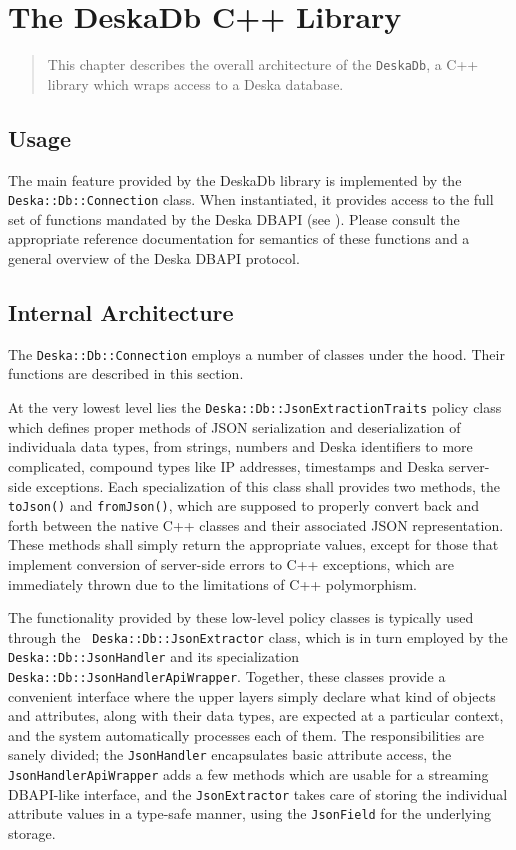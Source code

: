 \documentclass[deska]{subfiles}
\begin{document}
\chapter{The DeskaDb C++ Library}

\begin{abstract}
This chapter describes the overall architecture of the {\tt DeskaDb}, a C++ library which wraps access to a Deska
database.
\end{abstract}

\section{Usage}

The main feature provided by the DeskaDb library is implemented by the {\tt Deska::Db::Connection} class.  When
instantiated, it provides access to the full set of functions mandated by the Deska DBAPI (see ).
Please consult the appropriate reference documentation for semantics of these functions and a general overview of the
Deska DBAPI protocol.

\section{Internal Architecture}

The {\tt Deska::Db::Connection} employs a number of classes under the hood.  Their functions are described in this
section.

At the very lowest level lies the {\tt Deska::Db::JsonExtractionTraits} policy class which defines proper methods of
JSON serialization and deserialization of individuala data types, from strings, numbers and Deska identifiers to more
complicated, compound types like IP addresses, timestamps and Deska server-side exceptions.  Each specialization of this
class shall provides two methods, the {\tt toJson()} and {\tt fromJson()}, which are supposed to properly convert back
and forth between the native C++ classes and their associated JSON representation.  These methods shall simply return
the appropriate values, except for those that implement conversion of server-side errors to C++ exceptions, which are
immediately thrown due to the limitations of C++ polymorphism.

The functionality provided by these low-level policy classes is typically used through the {\tt
Deska::Db::JsonExtractor} class, which is in turn employed by the {\tt Deska::Db::JsonHandler} and its specialization
{\tt Deska::Db::JsonHandlerApiWrapper}.  Together, these classes provide a convenient interface where the upper layers
simply declare what kind of objects and attributes, along with their data types, are expected at a particular context,
and the system automatically processes each of them.  The responsibilities are sanely divided; the {\tt JsonHandler}
encapsulates basic attribute access, the {\tt JsonHandlerApiWrapper} adds a few methods which are usable for a streaming
DBAPI-like interface, and the {\tt JsonExtractor} takes care of storing the individual attribute values in a type-safe
manner, using the {\tt JsonField} for the underlying storage.
\end{document}
